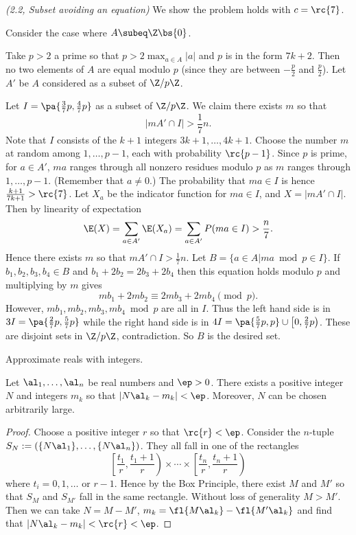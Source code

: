 \begin{problem}{\it (2.2, Subset avoiding an equation)}
We show the problem holds with $c=\rc{7}$.
\begin{st}
Consider the case where $A\subeq \Z\bs\{0\}$.
\end{st}
Take $p>2$ a prime so that $p>2\max_{a\in A}|a|$ and $p$ is in the form $7k+2$. Then no two elements of $A$ are equal modulo $p$ (since they are between $-\frac{p}{2}$ and $\frac{p}{2}$). Let $A'$ be $A$ considered as a subset of $\Z/p\Z$.

Let $I=\pa{\frac 37p,\frac 47p}$ as a subset of $\Z/p\Z$. 
We claim there exists $m$ so that
\[
|mA'\cap I|>\frac{1}{7}n.
\]
Note that $I$ consists of the $k+1$ integers $3k+1,\ldots, 4k+1$. Choose the number $m$ at random among $1,\ldots, p-1$, each with probability $\rc{p-1}$. Since $p$ is prime, for $a\in A'$, $ma$ ranges through all nonzero residues modulo $p$ as $m$ ranges through $1,\ldots, p-1$. (Remember that $a\neq 0$.)
The probability that $ma\in I$ is hence $\frac{k+1}{7k+1}>\rc{7}$. Let $X_a$ be the indicator function for $ma\in I$, and $X=|mA'\cap I|$. Then by linearity of expectation
\[
\E(X)=\sum_{a\in A'} \E(X_a)=\sum_{a\in A'}P(ma\in I)>\frac{n}{7}.
\] 
Hence there exists $m$ so that $mA'\cap I>\frac{1}{7}n$. Let $B=\{a\in A|ma\bmod{p}\in I\}$. If $b_1,b_2,b_3,b_4\in B$ and $b_1+2b_2=2b_3+2b_4$ then this equation holds modulo $p$ and multiplying by $m$ gives
\[
mb_1+2mb_2\equiv 2mb_3+2mb_4\pmod{p}.
\]
However, $mb_1,mb_2,mb_3,mb_4\bmod{p}$ are all in $I$. Thus the left hand side is in $3I=\pa{\frac{2}{7}p,\frac 57p}$ while the right hand side is in $4I=\pa{\frac 57 p,p}\cup\left[0,\frac 27p\right)$. These are disjoint sets in $\Z/p\Z$, contradiction. So $B$ is the desired set.\\

\begin{st}
Approximate reals with integers.
\end{st}
\begin{thm}[Dirichlet]
Let $\al_1,\ldots, \al_n$ be real numbers and $\ep>0$. There exists a positive integer $N$ and integers $m_k$ so that $|N\al_k-m_k|<\ep$. Moreover, $N$ can be chosen arbitrarily large.
\end{thm}
\begin{proof}
Choose a positive integer $r$ so that $\rc{r}<\ep$. 
Consider the $n$-tuple $S_N:=(\{N\al_1\},\ldots, \{N\al_n\})$. They all fall in one of the rectangles
\[
\left[
\frac{t_1}{r},\frac{t_1+1}{r}
\right)\times \cdots
\times
\left[
\frac{t_n}{r},\frac{t_n+1}{r}\right)
\]
where $t_i=0,1,\ldots$ or $r-1$. Hence by the Box Principle, there exist $M$ and $M'$ so that $S_M$ and $S_{M'}$ fall in the same rectangle. Without loss of generality $M>M'$. Then we can take $N=M-M'$, $m_k=\fl{M\al_k}-\fl{M'\al_k}$ and find that $|N\al_k-m_k|<\rc{r}<\ep$. 


\end{proof}
\end{problem}

